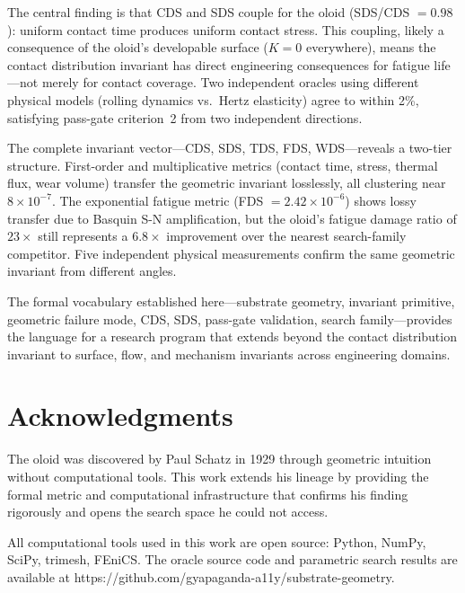 \documentclass[11pt,a4paper]{article}
\begin{document}
The central finding is that CDS and SDS couple for the oloid
(SDS/CDS $= 0.98$): uniform contact time produces uniform contact
stress. This coupling, likely a consequence of the oloid's developable
surface ($K = 0$ everywhere), means the contact distribution invariant
has direct engineering consequences for fatigue life---not merely
for contact coverage. Two independent oracles using different physical
models (rolling dynamics vs.\ Hertz elasticity) agree to within 2\%,
satisfying pass-gate criterion~2 from two independent directions.

The complete invariant vector---CDS, SDS, TDS, FDS, WDS---reveals a two-tier structure. First-order and multiplicative metrics (contact time, stress, thermal flux, wear volume) transfer the geometric invariant losslessly, all clustering near $8 \times 10^{-7}$. The exponential fatigue metric (FDS $= 2.42 \times 10^{-6}$) shows lossy transfer due to Basquin S-N amplification, but the oloid's fatigue damage ratio of $23\times$ still represents a $6.8\times$ improvement over the nearest search-family competitor. Five independent physical measurements confirm the same geometric invariant from different angles.

The formal vocabulary established here---substrate geometry, invariant
primitive, geometric failure mode, CDS, SDS, pass-gate validation,
search family---provides the language for a research program that
extends beyond the contact distribution invariant to surface, flow,
and mechanism invariants across engineering domains.


\section*{Acknowledgments}

The oloid was discovered by Paul Schatz in 1929 through geometric
intuition without computational tools. This work extends his lineage
by providing the formal metric and computational infrastructure that
confirms his finding rigorously and opens the search space he could
not access.

All computational tools used in this work are open source: Python,
NumPy, SciPy, trimesh, FEniCS. The oracle source code and parametric
search results are available at
https://github.com/gyapaganda-a11y/substrate-geometry.
\end{document}
